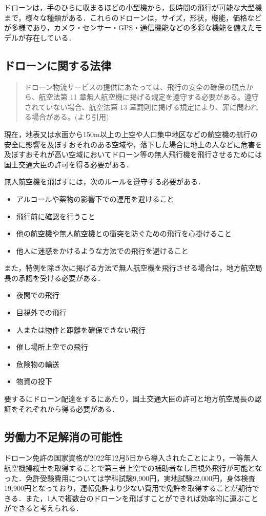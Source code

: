 \documentclass[a4paper, titlepage]{jsarticle}
\begin{document}
ドローンは，手のひらに収まるほどの小型機から，長時間の飛行が可能な大型機まで，様々な種類がある．これらのドローンは，サイズ，形状，機能，価格などが多様であり，カメラ・センサー・GPS・通信機能などの多彩な機能を備えたモデルが存在している．

\subsection{ドローンに関する法律}
\begin{quote}
  ドローン物流サービスの提供にあたっては、飛行の安全の確保の観点から、航空法第 11 章無人航空機に掲げる規定を遵守する必要がある。遵守されていない場合、航空法第 13 章罰則に掲げる規定により、罪に問われる場合がある。(\cite{delivery_guidelines_2023}より引用)
\end{quote}

現在，地表又は水面から150m以上の上空や人口集中地区などの航空機の航行の安全に影響を及ぼすおそれのある空域や，落下した場合に地上の人などに危害を及ぼすおそれが高い空域においてドローン等の無人飛行機を飛行させるためには国土交通大臣の許可を得る必要がある．

無人航空機を飛ばすには，次のルールを遵守する必要がある．\cite{prohibited_guidelines}
\begin{itemize}
  \item アルコールや薬物の影響下での運用を避けること
  \item 飛行前に確認を行うこと
  \item 他の航空機や無人航空機との衝突を防ぐための飛行を心掛けること
  \item 他人に迷惑をかけるような方法での飛行を避けること
\end{itemize}
また，特例を除き次に掲げる方法で無人航空機を飛行させる場合は，地方航空局長の承認を受ける必要がある．
\begin{itemize}
  \item 夜間での飛行
  \item 目視外での飛行
  \item 人または物件と距離を確保できない飛行
  \item 催し場所上空での飛行
  \item 危険物の輸送
  \item 物資の投下
\end{itemize}
要するにドローン配達をするにあたり，国土交通大臣の許可と地方航空局長の認証をそれぞれから得る必要がある．

\subsection{労働力不足解消の可能性}
ドローン免許の国家資格が2022年12月5日から導入されたことにより，一等無人航空機操縦士を取得することで第三者上空での補助者なし目視外飛行が可能となった．免許受験費用については学科試験9,900円，実地試験22,000円，身体検査19,900円となっており，運転免許より少ない費用で免許を取得することが期待できる．また，1人で複数台のドローンを飛ばすことができれば効率的に運ぶことができると考えられる．
\end{document}
